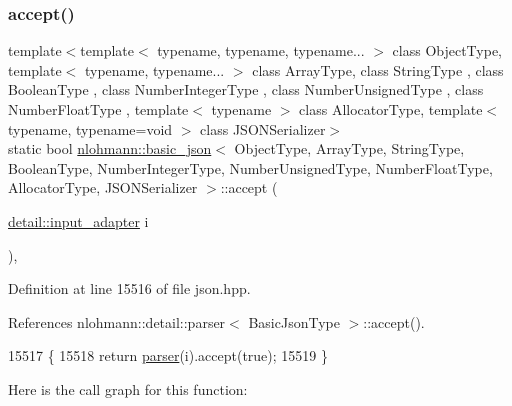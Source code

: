 \subsubsection{\texorpdfstring{accept()}{accept()}\hspace{0.1cm}{\footnotesize\ttfamily [1/3]}}
{\footnotesize\ttfamily template$<$template$<$ typename, typename, typename... $>$ class Object\+Type, template$<$ typename, typename... $>$ class Array\+Type, class String\+Type , class Boolean\+Type , class Number\+Integer\+Type , class Number\+Unsigned\+Type , class Number\+Float\+Type , template$<$ typename $>$ class Allocator\+Type, template$<$ typename, typename=void $>$ class J\+S\+O\+N\+Serializer$>$ \\
static bool \hyperlink{classnlohmann_1_1basic__json}{nlohmann\+::basic\+\_\+json}$<$ Object\+Type, Array\+Type, String\+Type, Boolean\+Type, Number\+Integer\+Type, Number\+Unsigned\+Type, Number\+Float\+Type, Allocator\+Type, J\+S\+O\+N\+Serializer $>$\+::accept (\begin{DoxyParamCaption}\item[{\hyperlink{classnlohmann_1_1detail_1_1input__adapter}{detail\+::input\+\_\+adapter}}]{i }\end{DoxyParamCaption})\hspace{0.3cm}{\ttfamily [inline]}, {\ttfamily [static]}}



Definition at line 15516 of file json.\+hpp.



References nlohmann\+::detail\+::parser$<$ Basic\+Json\+Type $>$\+::accept().


\begin{DoxyCode}
15517     \{
15518         \textcolor{keywordflow}{return} \hyperlink{classnlohmann_1_1basic__json_aba9704e82d18f8954f9925e26cec7a51}{parser}(i).accept(\textcolor{keyword}{true});
15519     \}
\end{DoxyCode}
Here is the call graph for this function\+:
\mbox{\label{classnlohmann_1_1basic__json_a2c3a529fba80aa83557246b910181388}} 

